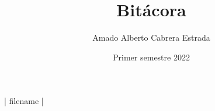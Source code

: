 \documentclass[spanish,code]{HomeWork}
\institute{Laboratorio de investigación}
\title{Bitácora}
\author{Amado Alberto Cabrera Estrada}
\date{Primer semestre 2022}
\begin{document}
{{  }}

{| filename |}

\end{document}
